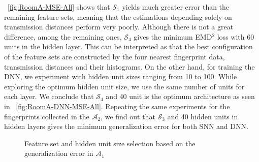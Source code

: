 \documentclass{article}
\begin{document}
	\figurename~\ref{fig:RoomA-MSE-All} shows that $\mathcal{S}_1$ yields much greater error than the remaining feature sets, meaning that the estimations depending solely on transmission distances perform very poorly. Although there is not a great difference, among the remaining ones, $\mathcal{S}_4$ gives the minimum EMD$^2$ loss with 60 units in the hidden layer. This can be interpreted as that the best configuration of the feature sets are constructed by the four nearest fingerprint data, transmission distances and their histograms. On the other hand, for training the DNN, we experiment with hidden unit sizes ranging from 10 to 100. While exploring the optimum hidden unit size, we use the same number of units for each layer. We conclude that $\mathcal{S}_4$ and 40 unit is the optimum architecture as seen in \figurename~\ref{fig:RoomA-DNN-MSE-All}. Repeating the same experiments for the fingerprints collected in the $\mathcal{A}_2$, we find out that $\mathcal{S}_3$ and 40 hidden units in hidden layers gives the minimum generalization error for both SNN and DNN. 
	\begin{figure}[h]
		\centering
		\caption{Feature set and hidden unit size selection based on the generalization error in $\mathcal{A}_1$}
	\end{figure}
	
\end{document}
